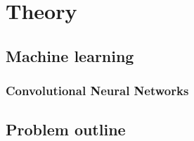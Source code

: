\chapter{Theory}\label{cha:intro}

\section{Machine learning}\label{sec:research:history}
\subsection{Convolutional Neural Networks}\label{sec:research:history}



\section{Problem outline}\label{sec:research:history}
